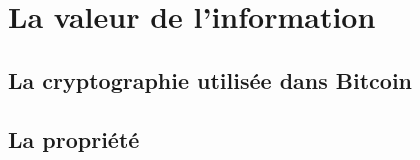 \chapter{La valeur de l'information}

\section{La cryptographie utilisée dans Bitcoin}

\section{La propriété}